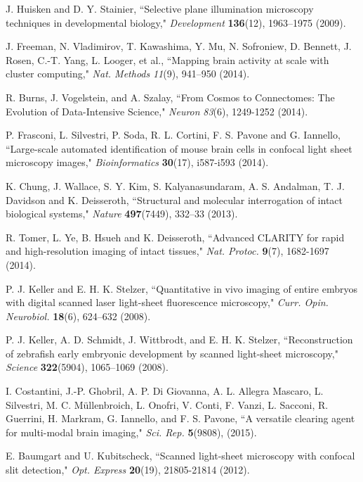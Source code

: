 \documentclass[12pt]{spieman}  %
\begin{document}
\begin{spacing}{2}
\begin{thebibliography}{0}
 J. Huisken and D. Y. Stainier, ``Selective plane illumination microscopy techniques in developmental biology," \emph{Development} \textbf{136}(12), 1963–1975 (2009).

 J. Freeman, N. Vladimirov, T. Kawashima, Y. Mu, N. Sofroniew, D. Bennett, J. Rosen, C.-T. Yang, L. Looger, et al., ``Mapping brain activity at scale with cluster computing," \emph{Nat. Methods} \emph{11}(9), 941–950 (2014).

 R. Burns, J. Vogelstein, and A. Szalay, ``From Cosmos to Connectomes: The Evolution of Data-Intensive Science," \emph{Neuron} \emph{83}(6), 1249-1252 (2014).

 P. Frasconi, L. Silvestri, P. Soda, R. L. Cortini, F. S. Pavone and G. Iannello, ``Large-scale automated identification of mouse brain cells in confocal light sheet microscopy images," \emph{Bioinformatics} \textbf{30}(17), i587-i593 (2014).

 K. Chung, J. Wallace, S. Y. Kim, S. Kalyanasundaram, A. S. Andalman, T. J. Davidson and K. Deisseroth, ``Structural and molecular interrogation of intact biological systems," \emph{Nature} \textbf{497}(7449), 332–33 (2013).

 R. Tomer, L. Ye, B. Hsueh and K. Deisseroth, ``Advanced CLARITY for rapid and high-resolution imaging of intact tissues," \emph{Nat. Protoc.} \textbf{9}(7), 1682-1697 (2014).

 P. J. Keller and E. H. K. Stelzer, ``Quantitative in vivo imaging of entire embryos with digital scanned laser light-sheet fluorescence microscopy," \emph{Curr. Opin. Neurobiol.} \textbf{18}(6), 624–632 (2008).

 P. J. Keller, A. D. Schmidt, J. Wittbrodt, and E. H. K. Stelzer, ``Reconstruction of zebrafish early embryonic development by scanned light-sheet microscopy," \emph{Science} \textbf{322}(5904), 1065–1069 (2008).

 I. Costantini, J.-P. Ghobril, A. P. Di Giovanna, A. L. Allegra Mascaro, L. Silvestri, M. C. M\"{u}llenbroich, L. Onofri, V. Conti, F. Vanzi, L. Sacconi, R. Guerrini, H. Markram, G. Iannello, and F. S. Pavone, ``A versatile clearing agent for multi-modal brain imaging," \emph{Sci. Rep.} \textbf{5}(9808), (2015).

 E. Baumgart and U. Kubitscheck, ``Scanned light-sheet microscopy with confocal slit detection," \emph{Opt. Express} \textbf{20}(19), 21805-21814 (2012).


\end{thebibliography}
\end{spacing}
\end{document}
